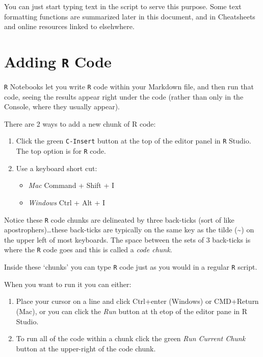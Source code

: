 \documentclass[
]{book}
\newcommand{\passthrough}[1]{#1}
\providecommand{\tightlist}{%
  \setlength{\itemsep}{0pt}\setlength{\parskip}{0pt}}
\begin{document}
You can just start typing text in the script to serve this purpose. Some text formatting functions are summarized later in this document, and in Cheatsheets and online resources linked to elsehwhere.

\hypertarget{adding-r-code}{%
\section*{\texorpdfstring{Adding \texttt{R} Code}{Adding R Code}}\label{adding-r-code}}

\passthrough{\lstinline!R!} Notebooks let you write \passthrough{\lstinline!R!} code within your Markdown file, and then run that code, seeing the results appear right under the code (rather than only in the Console, where they usually appear).

There are 2 ways to add a new chunk of R code:

\begin{enumerate}
\def\labelenumi{\arabic{enumi}.}
\tightlist
\item
  Click the green \passthrough{\lstinline!C-Insert!} button at the top of the editor panel in \passthrough{\lstinline!R!} Studio. The top option is for \passthrough{\lstinline!R!} code.\\
\item
  Use a keyboard short cut:

  \begin{itemize}
  \tightlist
  \item
    \emph{Mac} Command + Shift + I
  \item
    \emph{Windows} Ctrl + Alt + I
  \end{itemize}
\end{enumerate}

Notice these \passthrough{\lstinline!R!} code chunks are delineated by three back-ticks (sort of like apostrophers)\ldots these back-ticks are typically on the same key as the tilde (\textasciitilde) on the upper left of most keyboards. The space between the sets of 3 back-ticks is where the \passthrough{\lstinline!R!} code goes and this is called a \emph{code chunk}.

Inside these `chunks' you can type \passthrough{\lstinline!R!} code just as you would in a regular \passthrough{\lstinline!R!} script.

When you want to run it you can either:

\begin{enumerate}
\def\labelenumi{\arabic{enumi}.}
\tightlist
\item
  Place your cursor on a line and click Ctrl+enter (Windows) or CMD+Return (Mac), or you can click the \emph{Run} button at th etop of the editor pane in R Studio.
\item
  To run all of the code within a chunk click the green \emph{Run Current Chunk} button at the upper-right of the code chunk.
\end{enumerate}
\end{document}
